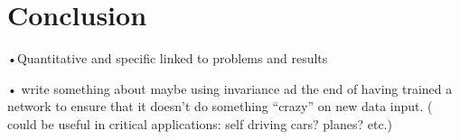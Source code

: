 \section{Conclusion}

•Quantitative and specific linked to problems and results

• write something about maybe using invariance ad the end of having trained a network to ensure that it doesn't do something ``crazy'' on new data input. ( could be useful in critical applications: self driving cars? planes? etc.)